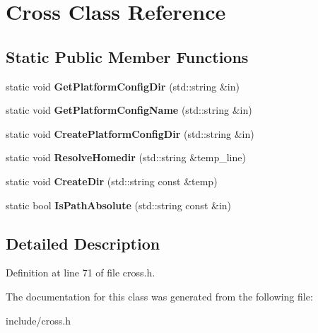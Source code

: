 \hypertarget{classCross}{\section{Cross Class Reference}
\label{classCross}
}
\subsection*{Static Public Member Functions}
\begin{DoxyCompactItemize}
\item 
\hypertarget{classCross_adc7854e9ad7241ce9f8db073fa826b9c}{static void {\bfseries Get\-Platform\-Config\-Dir} (std\-::string \&in)}\label{classCross_adc7854e9ad7241ce9f8db073fa826b9c}

\item 
\hypertarget{classCross_a45cdeeed2cff2ce0ec472a1dca77fbaf}{static void {\bfseries Get\-Platform\-Config\-Name} (std\-::string \&in)}\label{classCross_a45cdeeed2cff2ce0ec472a1dca77fbaf}

\item 
\hypertarget{classCross_ac2e9f294958bd78b91aa069cea63a9f1}{static void {\bfseries Create\-Platform\-Config\-Dir} (std\-::string \&in)}\label{classCross_ac2e9f294958bd78b91aa069cea63a9f1}

\item 
\hypertarget{classCross_a2230f6bc21766f8820400dd2e3cda492}{static void {\bfseries Resolve\-Homedir} (std\-::string \&temp\-\_\-line)}\label{classCross_a2230f6bc21766f8820400dd2e3cda492}

\item 
\hypertarget{classCross_afc331a76245b438d7d062b2d2aa7b892}{static void {\bfseries Create\-Dir} (std\-::string const \&temp)}\label{classCross_afc331a76245b438d7d062b2d2aa7b892}

\item 
\hypertarget{classCross_aae56011e950f7884240ec7af515644e6}{static bool {\bfseries Is\-Path\-Absolute} (std\-::string const \&in)}\label{classCross_aae56011e950f7884240ec7af515644e6}

\end{DoxyCompactItemize}


\subsection{Detailed Description}


Definition at line 71 of file cross.\-h.



The documentation for this class was generated from the following file\-:\begin{DoxyCompactItemize}
\item 
include/cross.\-h\end{DoxyCompactItemize}
